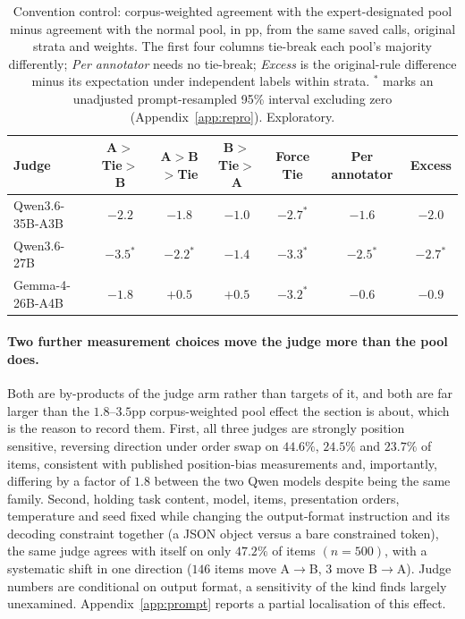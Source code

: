 \documentclass{article}
\begin{document}
\begin{table}[t]
\centering
\small
\caption{Convention control: corpus-weighted agreement with the expert-designated pool minus
agreement with the normal pool, in pp, from the same saved calls, original strata and
weights. The first four columns tie-break each pool's majority differently; \emph{Per
annotator} needs no tie-break; \emph{Excess} is the original-rule difference minus its
expectation under independent labels within strata. $^{*}$ marks an unadjusted
prompt-resampled 95\% interval excluding zero (Appendix~\ref{app:repro}). Exploratory.}
\label{tab:convention}
\setlength{\tabcolsep}{4pt}
\begin{tabular}{lcccccc}
\toprule
Judge & A$>$Tie$>$B & A$>$B$>$Tie & B$>$Tie$>$A & Force Tie & Per annotator & Excess \\
\midrule
Qwen3.6-35B-A3B & $-2.2$ & $-1.8$ & $-1.0$ & $-2.7^{*}$ & $-1.6$ & $-2.0$ \\
Qwen3.6-27B & $-3.5^{*}$ & $-2.2^{*}$ & $-1.4$ & $-3.3^{*}$ & $-2.5^{*}$ & $-2.7^{*}$ \\
Gemma-4-26B-A4B & $-1.8$ & $+0.5$ & $+0.5$ & $-3.2^{*}$ & $-0.6$ & $-0.9$ \\
\bottomrule
\end{tabular}
\end{table}

\paragraph{Two further measurement choices move the judge more than the pool does.}
Both are by-products of the judge arm rather than targets of it, and both are far larger than
the $1.8$--$3.5$pp corpus-weighted pool effect the section is about, which is the reason to
record them. First, all three
judges are strongly position sensitive, reversing direction under order swap on
$44.6\%$, $24.5\%$ and $23.7\%$ of items, consistent with published position-bias
measurements \citep{positionbias2026} and, importantly, differing by a factor of
$1.8$ between the two Qwen models despite being the same family. Second, holding task content, model,
items, presentation orders, temperature and seed fixed while changing the output-format
instruction and its decoding constraint together (a JSON object versus a bare constrained
token), the same judge agrees with itself on only $47.2\%$ of items
$(n=500)$, with a systematic shift in one direction ($146$ items move A$\to$B, $3$
move B$\to$A). Judge numbers are conditional on output format, a
sensitivity of the kind \citet{judgesense2026} finds largely unexamined. Appendix~\ref{app:prompt} reports a partial localisation of this effect.
\end{document}
